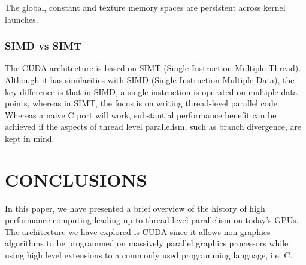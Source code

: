 \documentclass{article}
\begin{document}
The global, constant and texture memory spaces are persistent across kernel launches.  

\subsubsection{SIMD vs SIMT}
The CUDA architecture is based on SIMT (Single-Instruction Multiple-Thread).  Although it has similarities with SIMD (Single Instruction Multiple Data), the key difference is that in SIMD, a single instruction is operated on multiple data points, whereas in SIMT, the focus is on writing thread-level parallel code.  Whereas a naive C port will work, substantial performance benefit can be achieved if the aspects of thread level parallelism, such as branch divergence, are kept in mind.



\section{CONCLUSIONS}
In this paper, we have presented a brief overview of the history of high performance computing leading up to thread level parallelism on today's GPUs.  The architecture we have explored is CUDA since it allows non-graphics algorithms to be programmed on massively parallel graphics processors while using high level extensions to a commonly used programming language, i.e. C.  




\end{document}
